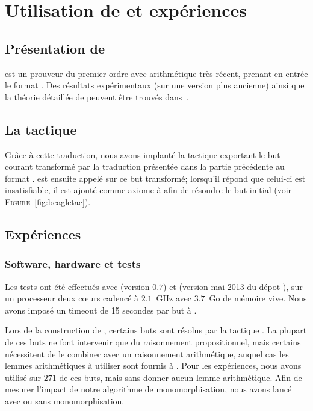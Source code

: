 \section{Utilisation de \beagle et expériences}
\label{sec:experiences}

\subsection{Présentation de \beagle}
\beagle est un prouveur du premier ordre avec arithmétique très récent,
prenant en entrée le format \tff. Des résultats expérimentaux (sur une
version plus ancienne) ainsi que la théorie détaillée de \beagle peuvent être trouvés dans~\cite{DBLP:conf/cade/BaumgartnerW13}.


\subsection{La tactique \beagletac}
\label{sec:experiences:beagletac}

Grâce à cette traduction, nous avons implanté la tactique \beagletac
exportant le but courant transformé par la traduction présentée dans la
partie précédente au format \tff. \beagle est ensuite appelé sur ce but
transformé; lorsqu'il répond que celui-ci est insatisfiable, il est
ajouté comme axiome à \holfour afin de résoudre le but initial (voir
\textsc{Figure}~\ref{fig:beagletac}).


\subsection{Expériences}
\label{sec:experiences:experiences}

\subsubsection{Software, hardware et tests}
Les tests ont été effectués avec \beagle (version $0.7$) et \holfour (version mai 2013 du dépot ), sur un processeur deux cœurs cadencé à $2.1$~GHz avec $3.7$~Go de mémoire vive.
Nous avons imposé un timeout de 15 secondes par but à \beagle.

Lors de la construction de \holfour, certains buts sont résolus par la
tactique \metistac. La plupart de ces buts ne font intervenir que du
raisonnement propositionnel, mais certains nécessitent de le combiner
avec un raisonnement arithmétique, auquel cas les lemmes arithmétiques à
utiliser sont fournis à \metistac. Pour les expériences, nous avons
utilisé \beagletac sur $271$ de ces buts, mais sans donner aucun lemme
arithmétique. Afin de mesurer l'impact de notre algorithme de
monomorphisation, nous avons lancé \beagletac avec ou sans
monomorphisation.



